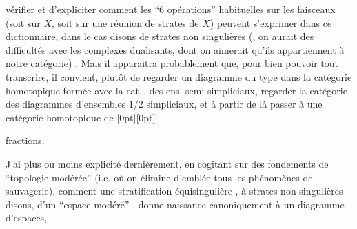 %
vérifier et d'expliciter comment les ``6 opérations'' habituelles sur les faisceaux (soit sur $X$, soit sur une réunion de strates de $X$) peuvent s'exprimer dans ce dictionnaire, dans le cas disons de strates non singulières (, on aurait des difficultés avec les complexes dualisants, dont on aimerait qu'ils appartiennent à notre catégorie) . Mais il apparaitra probablement que, pour bien pouvoir tout transcrire, il convient, plutôt  de regarder un diagramme du type
dans la catégorie homotopique formée avec la cat.\,. des ens. semi-simpliciaux,  regarder la catégorie des diagrammes d'ensembles $1/2$ simpliciaux, et à partir de là passer à une catégorie homotopique de
\raisebox{0pt}[0pt][0pt]{\parbox{0pt}{}}fractions.

J'ai plus ou moins explicité dernièrement, en cogitant sur des fondements de ``topologie modérée'' (i.e. où on élimine d'emblée tous les phénomènes de sauvagerie), comment une stratification équisingulière%
, à strates non singulières disons, d'un ``espace modéré'' , donne naissance canoniquement à un diagramme  d'espaces,
